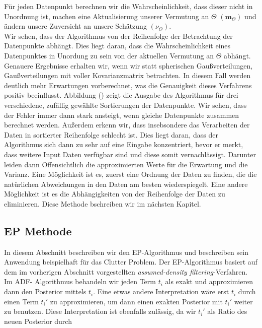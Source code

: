\documentclass[12pt,a4paper]{scrartcl}
\numberwithin{equation}{section}
\begin{document}
{  Für jeden Datenpunkt berechnen wir die Wahrscheinlichkeit, dass dieser nicht in Unordnung ist, machen
  eine Aktualisierung unserer Vermutung an $\Theta$ $(\mathbf{m}_{\Theta})$ und ändern unsere Zuversicht an unsere
  Schätzung $(\nu_{\Theta})$. \\
  Wir sehen, dass der Algorithmus von der Reihenfolge der Betrachtung der Datenpunkte abhängt. Dies liegt daran, dass
  die Wahrscheinlichkeit eines Datenpunktes in Unordung zu sein von der aktuellen Vermutung an $\Theta$ abhängt. 
  Genauere Ergebnisse erhalten wir, wenn wir statt spherischen Gaußverteilungen, Gaußverteilungen mit voller
  Kovarianzmatrix betrachten. In diesem Fall werden deutlich mehr Erwartungen vorberechnet, was die Genauigkeit 
  dieses Verfahrens positiv beeinflusst. 
  Abbildung () zeigt die Ausgabe des Algorithmus für drei verschiedene, zufällig gewählte Sortierungen 
  der Datenpunkte. 
  Wir sehen, dass der Fehler immer dann stark ansteigt, wenn gleiche Datenpunkte zusammen berechnet werden.
  Außerdem erkenn wir, dass insebsondere das Verarbeiten der Daten in sortierter Reihenfolge schlecht ist. 
  Dies liegt daran, dass der Algorithmus sich dann zu sehr auf eine Eingabe konzentriert, bevor er merkt, dass weitere
  Input Daten verfügbar sind und diese somit vernachlässigt. Darunter leiden dann Offensichtlich die approximierten Werte
  für die Erwartung und die Varianz. 
  Eine Möglichkeit ist es, zuerst eine Ordnung der Daten zu finden, die die natürlichen Abweichungen in den Daten 
  am besten wiederspiegelt. Eine andere Möglichkeit ist es die Abhängigkeiten von der Reihenfolge der Daten zu eliminieren. 
  Diese Methode bschreiben wir im nächsten Kapitel. 
  
  \subsection{EP Methode}
  
  In diesem Abschnitt beschreiben wir den EP-Algorithmus und beschreiben sein Anwendung beispielhaft für 
  das Clutter Problem. Der EP-Algorithmus basiert auf dem im vorherigen Abschnitt vorgestellten \textit{assumed-density filtering}-Verfahren.
  Im ADF- Algorithmus behandeln wir jeden Term $t_i$ als exakt und approximieren dann den Posterior mittels $t_i$. 
  Eine etwas andere Interpretation wäre erst $t_i$ durch einen Term $t_i'$ zu approximieren, um dann einen exakten
  Posterior mit $t_i'$ weiter zu benutzen. Diese Interpretation ist ebenfalls zulässig, da wir $t_i'$ als Ratio des neuen 
  Posterior durch 
  
}
\end{document}
